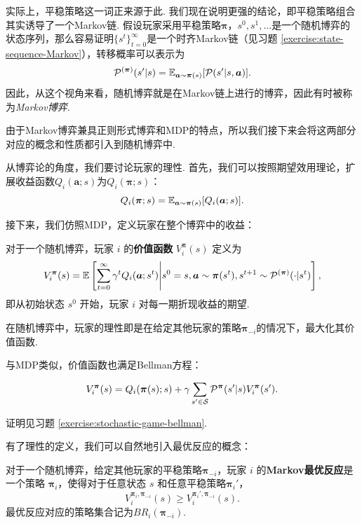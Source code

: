 实际上，平稳策略这一词正来源于此. 我们现在说明更强的结论，即平稳策略组合其实诱导了一个Markov链. 假设玩家采用平稳策略$\boldsymbol \pi$，$s^0,s^1,\dots$是一个随机博弈的状态序列，那么容易证明$\{s^t\}_{t=0}^{\infty}$是一个时齐Markov链（见习题 \ref{exercise:state-sequence-Markov}），转移概率可以表示为
\[\mathcal P^{(\boldsymbol \pi)}(s'|s)=\mathbb{E}_{\boldsymbol a\sim \boldsymbol \pi(s)}[\mathcal P(s'|s,\boldsymbol a)].\]
因此，从这个视角来看，随机博弈就是在Markov链上进行的博弈，因此有时被称为\textit{Markov博弈}.

由于Markov博弈兼具正则形式博弈和MDP的特点，所以我们接下来会将这两部分对应的概念和性质都引入到随机博弈中.

从博弈论的角度，我们要讨论玩家的理性. 首先，我们可以按照期望效用理论，扩展收益函数$Q_i(\boldsymbol a;s)$为$Q_i(\boldsymbol \pi;s)$：
\[Q_i(\boldsymbol \pi;s)=\mathbb{E}_{\boldsymbol a\sim \boldsymbol \pi(s)}[Q_i(\boldsymbol a;s)].\]

接下来，我们仿照MDP，定义玩家在整个博弈中的收益：

\begin{definition}[价值函数]
    对于一个随机博弈，玩家 $i$ 的\textbf{价值函数} $V_i^{\boldsymbol \pi}(s)$ 定义为
    \[V_i^{\boldsymbol \pi}(s) = \mathbb{E}\left[\sum_{t=0}^{\infty} \gamma^t Q_i(\boldsymbol a; s^t)\middle| s^0=s, \boldsymbol a\sim \boldsymbol \pi(s^t), s^{t+1}\sim \mathcal P^{(\boldsymbol \pi)}(\cdot|s^t)\right],\]
    即从初始状态 $s^0$ 开始，玩家 $i$ 对每一期折现收益的期望.
\end{definition}

在随机博弈中，玩家的理性即是在给定其他玩家的策略$\boldsymbol \pi_{-i}$的情况下，最大化其价值函数. 

与MDP类似，价值函数也满足Bellman方程：

\begin{theorem}[Bellman方程]\label{thm:stochastic-game-bellman}
        \[V_i^{\boldsymbol \pi}(s) = Q_i(\boldsymbol \pi(s);s) + \gamma \sum_{s'\in \mathcal S} \mathcal P^{\boldsymbol\pi}(s'|s)V_i^{\boldsymbol \pi}(s').\]
\end{theorem}
证明见习题 \ref{exercise:stochastic-game-bellman}.

有了理性的定义，我们可以自然地引入最优反应的概念：

\begin{definition}[Markov最优反应]
    对于一个随机博弈，给定其他玩家的平稳策略$\boldsymbol \pi_{-i}$，玩家 $i$ 的\textbf{Markov最优反应}是一个策略 $\boldsymbol \pi_i$，使得对于任意状态 $s$ 和任意平稳策略$\boldsymbol \pi_i'$，
    \[V_i^{\boldsymbol \pi_i,\boldsymbol \pi_{-i}}(s)\geq V_i^{\boldsymbol \pi_i',\boldsymbol \pi_{-i}}(s).\]
    最优反应对应的策略集合记为$BR_i(\boldsymbol \pi_{-i})$.
\end{definition}

